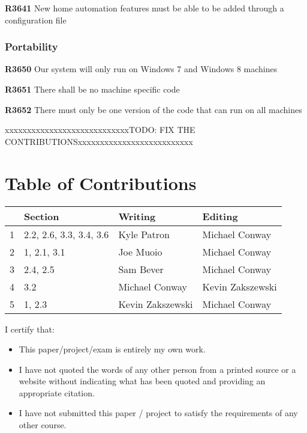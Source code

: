 \documentclass{article}
\begin{document}
\textbf{R3641} New home automation features must be able to be added through a configuration file

\subsubsection{Portability}
\textbf{R3650} Our system will only run on Windows 7 and Windows 8 machines 

\textbf{R3651} There shall be no machine specific code

\textbf{R3652} There must only be one version of the code that can run on all machines


\newpage
{\color{red}xxxxxxxxxxxxxxxxxxxxxxxxxxxxTODO: FIX THE CONTRIBUTIONSxxxxxxxxxxxxxxxxxxxxxxxxxx}
\section*{\centering Table of Contributions}
\begin{tabular}{| l | l | l | l |}
    \hline
     & Section & Writing & Editing \\
    \hline \hline
    1 & 2.2, 2.6, 3.3, 3.4, 3.6  & Kyle Patron & Michael Conway\\ \hline
    2 & 1, 2.1, 3.1 & Joe Muoio & Michael Conway\\ \hline
    3 & 2.4, 2.5 & Sam Bever & Michael Conway\\ \hline
    4 & 3.2 & Michael Conway & Kevin Zakszewski \\ \hline
    5 & 1, 2.3 & Kevin Zakszewski & Michael Conway \\ \hline
\end{tabular}
\newpage
\noindent I certify that:
\begin{itemize}
\item This paper/project/exam is entirely my own work.
\item I have not quoted the words of any other person from a printed source or a website without indicating what has been quoted and providing an appropriate citation.
\item I have not submitted this paper / project to satisfy the requirements of any other course.
\end{itemize}

\vspace{1cm}
\noindent{}
\end{document}
